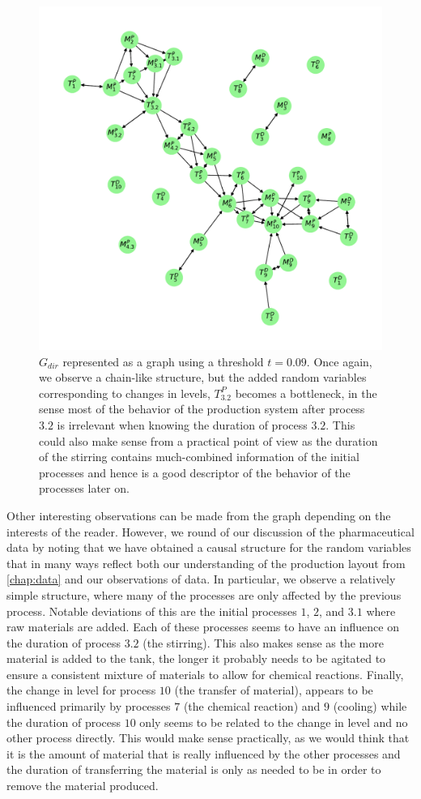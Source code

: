 \documentclass[../Thesis.tex]{subfiles}
\begin{document}
\begin{figure}[H]
    \centering
    \includegraphics[width = .75\linewidth]{figures/Cycle data/G_dir times and levelchanges as graph - directed - 0_09.pdf}
    \caption{$G_{dir}$ represented as a graph using a threshold $t = 0.09$. Once again, we observe a chain-like structure, but the added random variables corresponding to changes in levels, $T^P_{3.2}$ becomes a bottleneck, in the sense most of the behavior of the production system after process $3.2$ is irrelevant when knowing the duration of process $3.2$. This could also make sense from a practical point of view as the duration of the stirring contains much-combined information of the initial processes and hence is a good descriptor of the behavior of the processes later on.}
    \label{fig:G_dir times and levelchanges - semidirected - as graph}
\end{figure}
Other interesting observations can be made from the graph depending on the interests of the reader. However, we round of our discussion of the pharmaceutical data by noting that we have obtained a causal structure for the random variables that in many ways reflect both our understanding of the production layout from \autoref{chap:data} and our observations of data. In particular, we observe a relatively simple structure, where many of the processes are only affected by the previous process. Notable deviations of this are the initial processes $1$, $2$, and $3.1$ where raw materials are added. Each of these processes seems to have an influence on the duration of process $3.2$ (the stirring). This also makes sense as the more material is added to the tank, the longer it probably needs to be agitated to ensure a consistent mixture of materials to allow for chemical reactions. Finally, the change in level for process $10$ (the transfer of material), appears to be influenced primarily by processes $7$ (the chemical reaction) and $9$ (cooling) while the duration of process $10$ only seems to be related to the change in level and no other process directly. This would make sense practically, as we would think that it is the amount of material that is really influenced by the other processes and the duration of transferring the material is only as needed to be in order to remove the material produced.
\end{document}
